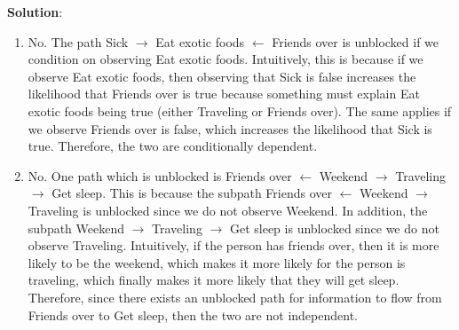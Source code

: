 \documentclass[submit]{../harvardml}
\newenvironment{solution}{
    \vspace{2mm}
    \color{blue}\noindent\textbf{Solution}:
}{}
\begin{document}
\begin{solution}
\begin{enumerate}
    \item No. The path Sick $\rightarrow$ Eat exotic foods $\leftarrow$ Friends over is unblocked if we condition on observing Eat exotic foods. Intuitively, this is because if we observe Eat exotic foods, then observing that Sick is false increases the likelihood that Friends over is true because something must explain Eat exotic foods being true (either Traveling or Friends over). The same applies if we observe Friends over is false, which increases the likelihood that Sick is true. Therefore, the two are conditionally dependent.
    
    \item No. One path which is unblocked is Friends over $\leftarrow$ Weekend $\rightarrow$ Traveling $\rightarrow$ Get sleep. This is because the subpath Friends over $\leftarrow$ Weekend $\rightarrow$ Traveling is unblocked since we do not observe Weekend. In addition, the subpath Weekend $\rightarrow$ Traveling $\rightarrow$ Get sleep is unblocked since we do not observe Traveling. Intuitively, if the person has friends over, then it is more likely to be the weekend, which makes it more likely for the person is traveling, which finally makes it more likely that they will get sleep. Therefore, since there exists an unblocked path for information to flow from Friends over to Get sleep, then the two are not independent.
    

\end{enumerate}
\end{solution}
\end{document}
